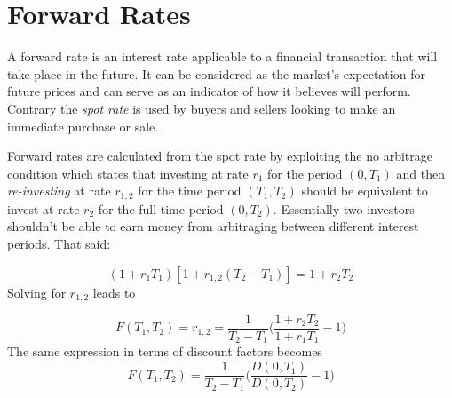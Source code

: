 \section{Forward Rates}
\label{calculating-forward-rates}
A forward rate is an interest rate applicable to a financial transaction that will take place in the future. It can be considered as the market's expectation for future prices and can serve as an indicator of how it believes will perform. Contrary the \emph{spot rate} is used by buyers and sellers looking to make an immediate purchase or sale.

Forward rates are calculated from the spot rate by exploiting the no arbitrage condition which states that investing at rate $r_1$ for the period $(0, T_1)$ and then \emph{re-investing} at rate $r_{1,2}$ for the time period $(T_1, T_2)$ should be equivalent to invest at rate $r_2$ for the full time period $(0, T_2)$. Essentially two investors shouldn't be able to earn money from arbitraging between different interest periods. That said:

\begin{equation}
(1+r_1 T_1)[1+r_{1,2}(T_2 - T_1)] = 1 + r_2 T_2
\label{eq:no_arbitrage_r}
\end{equation}
Solving for $r_{1,2}$ leads to

\begin{equation}
F(T_1, T_2) = r_{1,2} = \frac{1}{T_2 - T_1}\Big(\frac{1+r_2 T_2}{1+r_1 T_1} - 1 \Big)
\label{eq:forward_rate_simple}
\end{equation}
The same expression in terms of discount factors becomes
\begin{equation}
F(T_1, T_2) = \frac{1}{T_2 - T_1}\Big(\frac{D(0, T_1)}{D(0, T_2)} - 1 \Big)
\end{equation}

